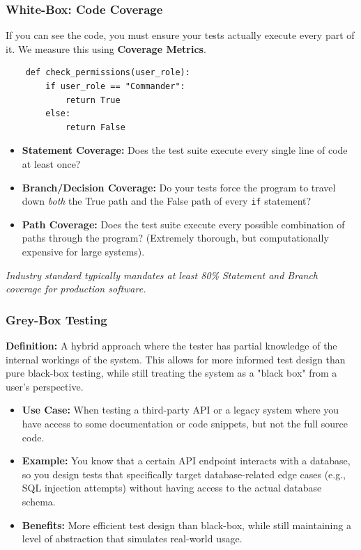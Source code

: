 \documentclass[xcolor=table]{beamer}
\begin{document}
\begin{frame}[fragile]
    \frametitle{White-Box: Code Coverage}
    \footnotesize
    If you can see the code, you must ensure your tests actually execute every part of it. We measure this using \textbf{Coverage Metrics}.
    
    \begin{verbatim}
    def check_permissions(user_role):
        if user_role == "Commander":
            return True
        else:
            return False
    \end{verbatim}

    \begin{itemize}
        \item \textbf{Statement Coverage:} Does the test suite execute every single line of code at least once?
        \item \textbf{Branch/Decision Coverage:} Do your tests force the program to travel down \textit{both} the True path and the False path of every \texttt{if} statement?
        \item \textbf{Path Coverage:} Does the test suite execute every possible combination of paths through the program? (Extremely thorough, but computationally expensive for large systems).
    \end{itemize}
    \textit{Industry standard typically mandates at least 80\% Statement and Branch coverage for production software.}
\end{frame}

\begin{frame}
    \frametitle{Grey-Box Testing}
    \textbf{Definition:} A hybrid approach where the tester has partial knowledge of the internal workings of the system. This allows for more informed test design than pure black-box testing, while still treating the system as a "black box" from a user's perspective.

    \begin{itemize}
        \item \textbf{Use Case:} When testing a third-party API or a legacy system where you have access to some documentation or code snippets, but not the full source code.
        \item \textbf{Example:} You know that a certain API endpoint interacts with a database, so you design tests that specifically target database-related edge cases (e.g., SQL injection attempts) without having access to the actual database schema.
        \item \textbf{Benefits:} More efficient test design than black-box, while still maintaining a level of abstraction that simulates real-world usage.
    \end{itemize}
\end{frame}
\end{document}
